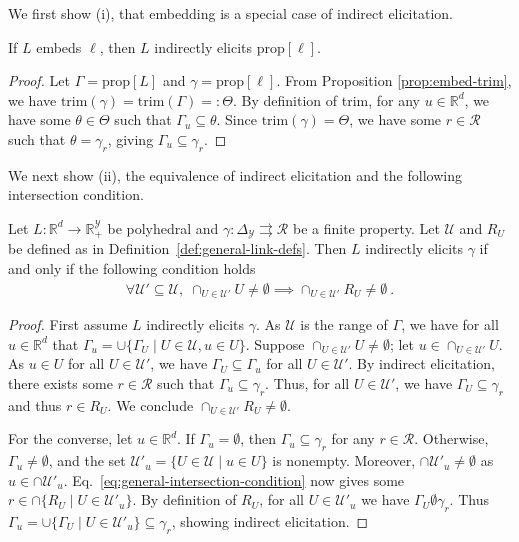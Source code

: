 \documentclass[twoside,11pt]{article}
\newcommand{\reals}{\mathbb{R}}
\newcommand{\prop}[1]{\mathrm{prop}[#1]}
\newcommand{\simplex}{\Delta_\Y}
\newcommand{\R}{\mathcal{R}}
\newcommand{\U}{\mathcal{U}}
\newcommand{\Y}{\mathcal{Y}}
\newcommand{\toto}{\rightrightarrows}
\newcommand{\trim}{\mathrm{trim}}
\begin{document}
We first show (i), that embedding is a special case of indirect elicitation.
\begin{lemma}\label{lem:embedding-implies-indirect-elic}
  If $L$ embeds $\ell$, then $L$ indirectly elicits $\prop\ell$.
\end{lemma}
\begin{proof}
  Let $\Gamma = \prop L$ and $\gamma = \prop\ell$.
  From Proposition \ref{prop:embed-trim}, we have $\trim(\gamma) = \trim(\Gamma) =: \Theta$.
  By definition of trim, for any $u\in\reals^d$, we have some $\theta \in \Theta$ such that $\Gamma_u \subseteq \theta$.
  Since $\trim(\gamma) = \Theta$, we have some $r\in\R$ such that $\theta = \gamma_r$, giving $\Gamma_u \subseteq \gamma_r$.
\end{proof}

We next show (ii), the equivalence of indirect elicitation and the following intersection condition.

\begin{lemma}\label{lem:intersection-equiv-indirect-elic}
  Let $L:\reals^d\to\reals^\Y_+$ be polyhedral and $\gamma:\simplex\toto\R$ be a finite property.
  Let $\U$ and $R_U$ be defined as in Definition~\ref{def:general-link-defs}.
  Then $L$ indirectly elicits $\gamma$
  if and only if the following condition holds
  \begin{align}
    \label{eq:general-intersection-condition}
    \forall \U'\subseteq\U,\; \cap_{U\in\U'} U \neq \emptyset \implies \cap_{U\in\U'} R_U \neq \emptyset~.
  \end{align}
\end{lemma}
\begin{proof}
  First assume $L$ indirectly elicits $\gamma$.
  As $\U$ is the range of $\Gamma$, we have for all $u\in\reals^d$ that $\Gamma_u = \cup\{\Gamma_U \mid U\in\U, u\in U\}$.
  Suppose $\cap_{U\in\U'} U \neq \emptyset$; let $u \in \cap_{U\in\U'} U$.
  As $u\in U$ for all $U\in\U'$, we have $\Gamma_U \subseteq \Gamma_u$ for all $U\in\U'$.
  By indirect elicitation, there exists some $r\in\R$ such that $\Gamma_u \subseteq \gamma_r$.
  Thus, for all $U\in\U'$, we have $\Gamma_U \subseteq \gamma_r$ and thus $r\in R_U$.
  We conclude $\cap_{U\in\U'} R_U \neq \emptyset$.

  For the converse, let $u\in\reals^d$.
  If $\Gamma_u = \emptyset$, then $\Gamma_u \subseteq \gamma_r$ for any $r\in\R$.
  Otherwise, $\Gamma_u \neq \emptyset$, and the set $\U'_u = \{U\in\U \mid u\in U\}$ is nonempty.
  Moreover, $\cap \U'_u \neq \emptyset$ as $u\in\cap \U'_u$.
  Eq.~\eqref{eq:general-intersection-condition} now gives some $r\in\cap\{R_U \mid U\in\U'_u\}$.
  By definition of $R_U$, for all $U\in\U'_u$ we have $\Gamma_U \emptyset \gamma_r$.
  Thus $\Gamma_u = \cup\{\Gamma_U \mid U\in\U'_u\} \subseteq \gamma_r$, showing indirect elicitation.
\end{proof}
\end{document}
